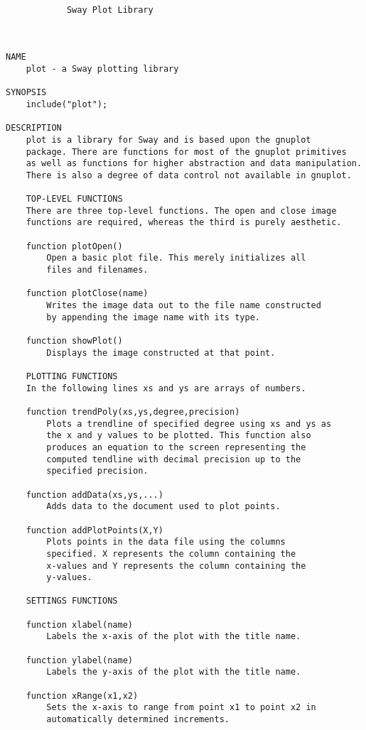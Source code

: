 \color{CodeGreen}
\begin{codesize}
\begin{verbatim}

			Sway Plot Library



NAME
	plot - a Sway plotting library

SYNOPSIS
	include("plot");

DESCRIPTION
	plot is a library for Sway and is based upon the gnuplot 
	package. There are functions for most of the gnuplot primitives 
	as well as functions for higher abstraction and data manipulation. 
	There is also a degree of data control not available in gnuplot.

    TOP-LEVEL FUNCTIONS
	There are three top-level functions. The open and close image 
	functions are required, whereas the third is purely aesthetic.
	
	function plotOpen()
		Open a basic plot file. This merely initializes all 
		files and filenames.
	
	function plotClose(name)
		Writes the image data out to the file name constructed 
		by appending the image name with its type.

	function showPlot()
		Displays the image constructed at that point.

    PLOTTING FUNCTIONS
	In the following lines xs and ys are arrays of numbers.
	
	function trendPoly(xs,ys,degree,precision)
		Plots a trendline of specified degree using xs and ys as 
		the x and y values to be plotted. This function also 
		produces an equation to the screen representing the 
		computed tendline with decimal precision up to the 
		specified precision.

	function addData(xs,ys,...)
		Adds data to the document used to plot points.

	function addPlotPoints(X,Y)
		Plots points in the data file using the columns 
		specified. X represents the column containing the 
		x-values and Y represents the column containing the 
		y-values.

    SETTINGS FUNCTIONS

	function xlabel(name)
		Labels the x-axis of the plot with the title name.

	function ylabel(name)
		Labels the y-axis of the plot with the title name.
	
	function xRange(x1,x2)
		Sets the x-axis to range from point x1 to point x2 in 
		automatically determined increments.	
	

\end{verbatim}
\end{codesize}
